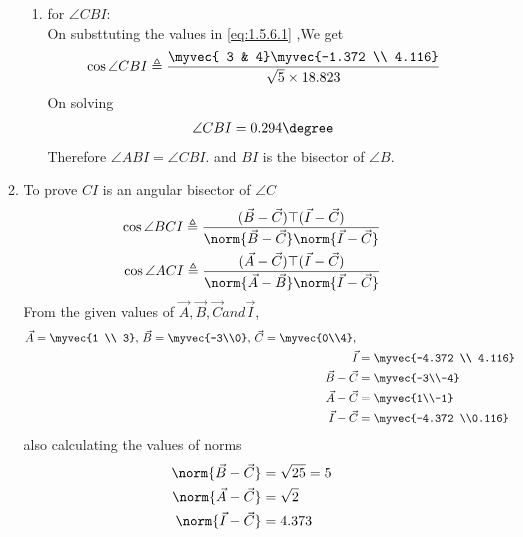 \documentclass[11pt]{book}
\begin{document}
\begin{enumerate}[label=\thesection.\arabic*.,ref=\thesection.\theenumi]
\begin{enumerate}
\begin{enumerate}
       \item for $\angle CBI$: \\
    On substtuting the values in  \eqref{eq:1.5.6.1} ,We get 
    \begin{align}
        \cos{\angle CBI} \triangleq \frac{\myvec{ 3 & 4}\myvec{-1.372 \\ 4.116}}{ \sqrt{5} \times 18.823} \\
    \end{align}
    On solving 
    \begin{align}
        \angle CBI = 0.294 \degree
    \end{align}
    Therefore $\angle ABI = \angle CBI.$ and $BI$ is the bisector of $\angle B$. 
\end{enumerate}


    \item To prove $CI$ is an angular bisector of $ \angle C$
\begin{align}
\label{eq:1.5.6.18}
\cos{\angle BCI} \triangleq \frac{(\vec{B}-\vec{C})\top(\vec{I}-\vec{C})}{\norm{\vec{B}-\vec{C}}\norm{\vec{I}-\vec{C}}} \\
\cos{\angle ACI} \triangleq \frac{(\vec{A}-\vec{C})\top(\vec{I}-\vec{C})}{\norm{\vec{A}-\vec{B}}\norm{\vec{I}-\vec{C}}} 
\end{align}
From the given values of $\vec{A},\vec{B},\vec{C} and \vec{I}$,\\
\begin{align}
    \vec{A}=\myvec{1 \\ 3},\,
\vec{B}=\myvec{-3\\0},\,
	\vec{C}=\myvec{0\\4},\, \\
 \vec{I} &= \myvec{-4.372 \\ 4.116} \\
	\vec{B}-\vec{C} &=\myvec{-3\\-4} \\
	\vec{A}-\vec{C}&= \myvec{1\\-1} \\
 \vec{I}-\vec{C}  &=\myvec{-4.372 \\0.116}
\end{align}
also calculating the values of norms
\begin{align}
	\norm{\vec{B}-\vec{C}} &= \sqrt{25}=5 \\
	\norm{\vec{A}-\vec{C}} &= \sqrt{2} \\
 	\norm{\vec{I}-\vec{C}} &= 4.373 \\
\end{align}



\end{enumerate}
\end{enumerate}
\end{document}

